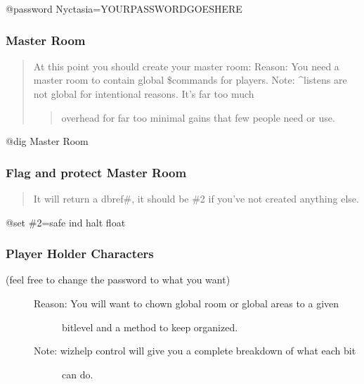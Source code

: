 \documentclass[letterpaper,10pt,english]{sphinxmanual}
\begin{document}
\sphinxAtStartPar
@password Nyctasia=YOURPASSWORDGOESHERE


\subsubsection{Master Room}
\label{\detokenize{gettingstarted:master-room}}\begin{quote}

\sphinxAtStartPar
At this point you should create your master room:
Reason: You need a master room to contain global \$commands for players.
Note: \textasciicircum{}listens are not global for intentional reasons.  It’s far too much
\begin{quote}

\sphinxAtStartPar
overhead for far too minimal gains that few people need or use.
\end{quote}
\end{quote}

\sphinxAtStartPar
@dig Master Room


\subsubsection{Flag and protect Master Room}
\label{\detokenize{gettingstarted:flag-and-protect-master-room}}\begin{quote}

\sphinxAtStartPar
It will return a dbref\#, it should be \#2 if you’ve not created anything else.
\end{quote}

\sphinxAtStartPar
@set \#2=safe ind halt float


\subsubsection{Player Holder Characters}
\label{\detokenize{gettingstarted:player-holder-characters}}\begin{description}
\item[{(feel free to change the password to what you want)}] \leavevmode\begin{description}
\item[{Reason: You will want to chown global room or global areas to a given}] \leavevmode
\sphinxAtStartPar
bitlevel and a method to keep organized.

\item[{Note: wizhelp control will give you a complete breakdown of what each bit}] \leavevmode
\sphinxAtStartPar
can do.

\end{description}

\end{description}
\end{document}

